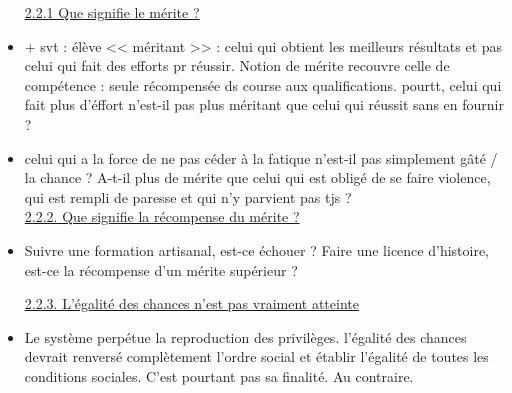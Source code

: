 \documentclass[12pt]{article}
\begin{document}
\begin{itemize}
\underline{2.2.1 Que signifie le mérite ?} \\

\item + svt : élève << méritant >> : celui qui obtient les meilleurs résultats et pas celui qui fait des efforts pr réussir. Notion de mérite recouvre celle de compétence : seule récompensée ds course aux qualifications. pourtt, celui qui fait plus d'éffort n'est-il pas plus méritant que celui qui réussit sans en fournir ?\\

\item celui qui a la force de ne pas céder à la fatique n'est-il pas simplement gâté / la chance ? A-t-il plus de mérite que celui qui est obligé de se faire violence, qui est rempli de paresse et qui n'y parvient pas tjs ? \\

\underline{2.2.2. Que signifie la récompense du mérite ?} \\

\item Suivre une formation artisanal, est-ce échouer ? Faire une licence d'histoire, est-ce la récompense d'un mérite supérieur ? 

\underline{2.2.3. L'égalité des chances n'est pas vraiment atteinte}\\

\item Le système perpétue la reproduction des privilèges. l'égalité des chances devrait renversé complètement l'ordre social et établir l'égalité de toutes les conditions sociales. C'est pourtant pas sa finalité. Au contraire.



\end{itemize}
\end{document}
